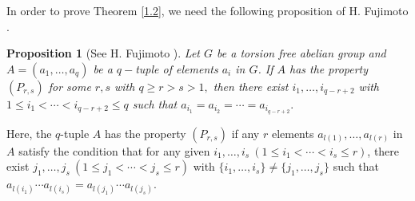 \documentclass[12pt, a4paper, oneside]{amsart}
\newtheorem{proposition}[equation]{Proposition}
\numberwithin{equation}{section}
\begin{document}
In order to prove Theorem \ref{1.2}, we need the following proposition of H. Fujimoto \cite{Fu75}. 

\begin{proposition}[{See H. Fujimoto \cite{Fu75}}]\label{new2} 
Let $G$ be a  torsion free abelian group and $A=(a_1,\ldots,a_q)$ be a $q-$tuple of elements $a_i$ in $G$. If $A$ has the property $(P_{r,s})$ for some $r,s$ with $q\ge r>s>1,$ then there exist $i_1,\ldots,i_{q-r+2}$ with $1\le i_1<\cdots<i_{q-r+2}\le q$ such that 
$a_{i_1}=a_{i_2}=\cdots=a_{i_{q-r+2}}.$
\end{proposition}
Here, the $q$-tuple $A$ has the property $(P_{r,s})$ if any $r$ elements $a_{l(1)},\ldots,a_{l(r)}$ in $A$ satisfy the condition that for any given $i_1,\ldots,i_s \ (1\le i_1<\cdots<i_s\le r)$, there exist $j_1,\ldots,j_s \ (1\le j_1<\cdots<j_s\le r)$ with $\{i_1,\ldots,i_s\}\neq\{j_1,\ldots,j_s\}$ such that $a_{l(i_1)}\cdots a_{l(i_s)}=a_{l(j_1)}\cdots a_{l(j_s)}.$
\end{document}
